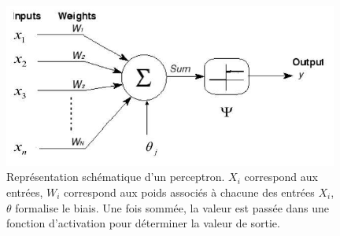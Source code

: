 \begin{figure}
  \centering
  \includegraphics[width=11cm]{./Chapitre2/figures/perceptron.png}
  \caption{Représentation schématique d'un perceptron. $X_i$ correspond aux entrées, $W_i$ correspond aux poids associés à chacune des entrées $X_i$, $\theta$ formalise le biais. Une fois sommée, la valeur est passée dans une fonction d'activation pour déterminer la valeur de sortie.}
  \label{fig:perceptron}
\end{figure}
